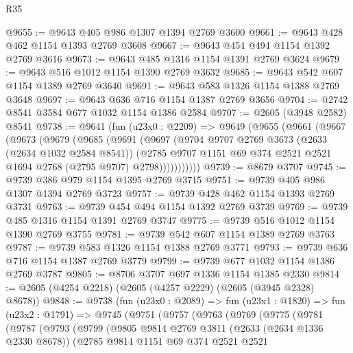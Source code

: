 \begin{lexlean}{R35}
\begin{coremodule}
@9655 := @9643 @405 @986 @1307 @1394 @2769 @3600
@9661 := @9643 @428 @462 @1154 @1393 @2769 @3608
@9667 := @9643 @454 @494 @1154 @1392 @2769 @3616
@9673 := @9643 @485 @1316 @1154 @1391 @2769 @3624
@9679 := @9643 @516 @1012 @1154 @1390 @2769 @3632
@9685 := @9643 @542 @607 @1154 @1389 @2769 @3640
@9691 := @9643 @583 @1326 @1154 @1388 @2769 @3648
@9697 := @9643 @636 @716 @1154 @1387 @2769 @3656
@9704 := @2742 @8541 @3584 @677 @1032 @1154 @1386 @2584
@9707 := @2605 (@3948 @2582) @8541
@9738 := @9641
    (fun (u23x0 : @2209) =>
    @9649
      (@9655
        (@9661
          (@9667
            (@9673
              (@9679
                (@9685
                  (@9691
                    (@9697
                      (@9704
                        @9707
                        @2769
                        @3673
                        (@2633 (@2634 @1032 @2584 @8541))
                        (@2785
                          @9707
                          @1151
                          @69
                          @374
                          @2521
                          @2521
                          @1694
                          @2768
                          (@2795 @9707)
                          @2798)))))))))))
@9739 := @8679 @3707
@9745 := @9739 @386 @979 @1154 @1395 @2769 @3715
@9751 := @9739 @405 @986 @1307 @1394 @2769 @3723
@9757 := @9739 @428 @462 @1154 @1393 @2769 @3731
@9763 := @9739 @454 @494 @1154 @1392 @2769 @3739
@9769 := @9739 @485 @1316 @1154 @1391 @2769 @3747
@9775 := @9739 @516 @1012 @1154 @1390 @2769 @3755
@9781 := @9739 @542 @607 @1154 @1389 @2769 @3763
@9787 := @9739 @583 @1326 @1154 @1388 @2769 @3771
@9793 := @9739 @636 @716 @1154 @1387 @2769 @3779
@9799 := @9739 @677 @1032 @1154 @1386 @2769 @3787
@9805 := @8706 @3707 @697 @1336 @1154 @1385 @2330
@9814 := @2605 (@4254 @2218) (@2605 (@4257 @2229) (@2605 (@3945 @2328) @8678))
@9848 := @9738
    (fun (u23x0 : @2089) =>
    fun (u23x1 : @1820) =>
    fun (u23x2 : @1791) =>
    @9745
      (@9751
        (@9757
          (@9763
            (@9769
              (@9775
                (@9781
                  (@9787
                    (@9793
                      (@9799
                        (@9805
                          @9814
                          @2769
                          @3811
                          (@2633 (@2634 @1336 @2330 @8678))
                          (@2785
                            @9814
                            @1151
                            @69
                            @374
                            @2521
                            @2521

\end{coremodule}
\end{lexlean}
